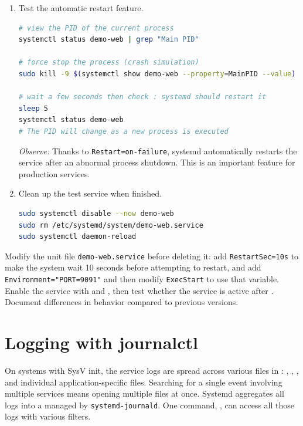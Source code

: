 \begin{enumerate}
\item Test the automatic restart feature.
\begin{lstlisting}[language=bash, caption={Testing automatic restart}]
# view the PID of the current process
systemctl status demo-web | grep "Main PID"

# force stop the process (crash simulation)
sudo kill -9 $(systemctl show demo-web --property=MainPID --value)

# wait a few seconds then check : systemd should restart it
sleep 5
systemctl status demo-web
# The PID will change as a new process is executed
\end{lstlisting}

\textit{Observe:} Thanks to \texttt{Restart=on-failure}, systemd automatically restarts the service after an abnormal process shutdown. This is an important feature for production services.

\item Clean up the test service when finished.
\begin{lstlisting}[language=bash, caption={Clean up the test service}]
sudo systemctl disable --now demo-web
sudo rm /etc/systemd/system/demo-web.service
sudo systemctl daemon-reload
\end{lstlisting}
\end{enumerate}

\begin{challengebox}
Modify the unit file \texttt{demo-web.service} before deleting it: add \texttt{RestartSec=10s} to make the system wait 10 seconds before attempting to restart, and add \texttt{Environment="PORT=9091"} and then modify \texttt{ExecStart} to use that variable. Enable the service with  and , then test whether the service is active after . Document differences in behavior compared to previous versions.
\end{challengebox}

\section{Logging with journalctl}
\label{sec:service-logging}

On systems with SysV init, the service logs are spread across various files in : , , , and individual application-specific files. Searching for a single event involving multiple services means opening multiple files at once. Systemd aggregates all logs into a  managed by \texttt{systemd-journald}. One command, , can access all those logs with various filters.

